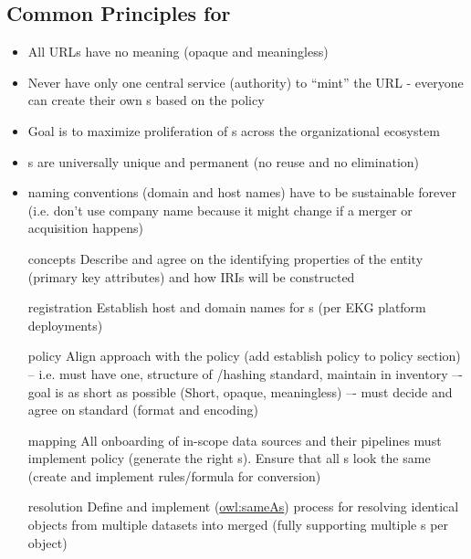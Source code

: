 \subsection*{Common Principles for }

\begin{itemize}
  \item All URLs have no meaning (opaque and meaningless)
  \item Never have only one central service (authority) to “mint” the URL - everyone can create their own
        s based on the policy
  \item Goal is to maximize proliferation of s across the organizational ecosystem
  \item {}s are universally unique and permanent (no reuse and no elimination)
  \item {} naming conventions (domain and host names) have to be sustainable forever
        (i.e. don’t use company name because it might change if a merger or acquisition happens)
\end{itemize}

\kgmmscoringsection

\kgmmscoringlevelOne

\begin{itemize}[leftmargin=1.5in]

  \item [concepts] Describe and agree on the identifying properties of the entity (primary key
        attributes) and how IRIs will be constructed
  \item [registration] Establish host and domain names for s (per EKG platform deployments)
  \item [policy] Align approach with the  policy (add establish policy to policy section) -- i.e.
        must have one, structure of /hashing standard, maintain in inventory –- goal is as short
        as possible (Short, opaque, meaningless) –- must decide and agree on standard (format and encoding)
  \item [mapping] All onboarding of in-scope data sources and their  pipelines must implement policy
        (generate the right s).
        Ensure that all s look the same (create and implement rules/formula for conversion)
  \item [resolution] Define and implement (\href{https://www.w3.org/TR/owl-ref/#sameAs-def}{owl:sameAs}) process for
        resolving identical objects from multiple datasets into merged  (fully supporting
        multiple s per object)

\end{itemize}

